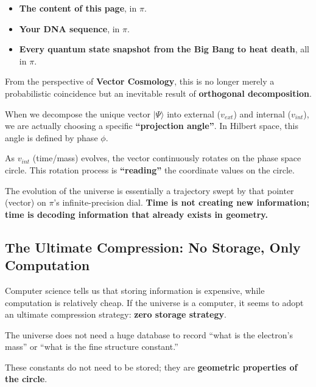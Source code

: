 \begin{itemize}
\item \textbf{The content of this page}, in $\pi$.

\item \textbf{Your DNA sequence}, in $\pi$.

\item \textbf{Every quantum state snapshot from the Big Bang to heat death}, all in $\pi$.
\end{itemize}

From the perspective of \textbf{Vector Cosmology}, this is no longer merely a probabilistic coincidence but an inevitable result of \textbf{orthogonal decomposition}.

When we decompose the unique vector $|\Psi\rangle$ into external ($v_{ext}$) and internal ($v_{int}$), we are actually choosing a specific \textbf{``projection angle''}. In Hilbert space, this angle is defined by phase $\phi$.

As $v_{int}$ (time/mass) evolves, the vector continuously rotates on the phase space circle. This rotation process is \textbf{``reading''} the coordinate values on the circle.

The evolution of the universe is essentially a trajectory swept by that pointer (vector) on $\pi$'s infinite-precision dial. \textbf{Time is not creating new information; time is decoding information that already exists in geometry.}

\subsection{The Ultimate Compression: No Storage, Only Computation}

Computer science tells us that storing information is expensive, while computation is relatively cheap. If the universe is a computer, it seems to adopt an ultimate compression strategy: \textbf{zero storage strategy}.

The universe does not need a huge database to record ``what is the electron's mass'' or ``what is the fine structure constant.''

These constants do not need to be stored; they are \textbf{geometric properties of the circle}.

